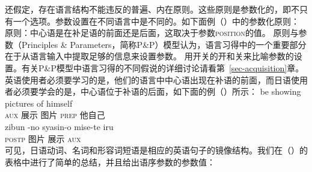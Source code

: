  \citet{Chomsky81a}还假定，存在语言结构不能违反的普遍、内在原则。这些原则是参数化的，即不只有一个选项。参数设置在不同语言中是不同的。如下面例（）中的参数化原则：
\ea
原则：中心语是在补足语的前面还是后面，这取决于参数\textsc{position}的值。
\z
原则与参数（Principles \& Parameters，简称P\&P）模型认为，语言习得中的一个重要部分在于从语言输入中提取足够的信息来设置参数。 \citet[]{Chomsky2000a-u}用开关的开和关来比喻参数的设置。有关P\&P模型中语言习得的不同假说的详细讨论请看第~\ref{sec-acquisition}章。英语使用者必须要学习的是，他们的语言中中心语出现在补语的前面，而日语使用者必须要学会的是，中心语位于补语的后面，如下面的例（）所示：
\eal
\label{Bsp-Kopfstellungsparameter}
\ex 
\gll be showing pictures of himself\\
     \textsc{aux} 展示 图片 \textsc{prep} 他自己\\
\ex
\gll zibun -no syasin-o mise-te iru\\
         \textsc{postp} 图片 展示 \textsc{aux}\\
\zl
可见，日语动词、名词和形容词短语是相应的英语句子的镜像结构。我们在（）的表格中进行了简单的总结，并且给出语序参数的参数值：
